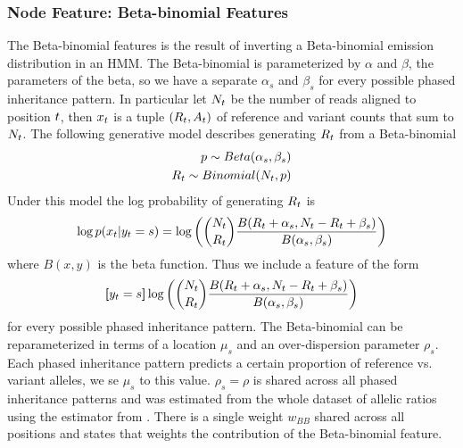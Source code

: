 \subsubsection{Node Feature: Beta-binomial Features}
The Beta-binomial features is the result of inverting a Beta-binomial emission distribution in an HMM. The Beta-binomial is parameterized by $\alpha$ and $\beta$, the parameters of the beta, so we have a separate $\alpha_s$ and $\beta_s$ for every possible phased inheritance pattern. In particular let $N_{t}$ be the number of reads aligned to position $t$, then $x_{t}$ is a tuple $(R_{t}, A_{t})$ of reference and variant counts that sum to $N_{t}$. The following generative model describes generating $R_{t}$ from a Beta-binomial
\begin{align*}
p \sim Beta(\alpha_s, \beta_s)\\
R_{t} \sim Binomial(N_{t}, p)
\end{align*}
Under this model the log probability of generating $R_{t}$ is
\begin{align*}
\log p(x_{t} | y_{t} = s) = \log \left(\binom{N_{t}}{R_{t}} \frac{B(R_{t} + \alpha_s, N_{t} - R_{t} + \beta_s)}{B(\alpha_s, \beta_s)}\right)
\end{align*}
where $B(x,y)$ is the beta function. Thus we include a feature of the form
\begin{align*}
\bm{[}y_{t} = s\bm{]}\log \left(\binom{N_{t}}{R_{t}} \frac{B(R_{t} + \alpha_s, N_{t} - R_{t} + \beta_s)}{B(\alpha_s, \beta_s)}\right) 
\end{align*}
for every possible phased inheritance pattern. The Beta-binomial can be reparameterized in terms of a location $\mu_s$ and an over-dispersion parameter $\rho_s$. Each phased inheritance pattern predicts a certain proportion of reference vs. variant alleles, we se $\mu_s$ to this value. $\rho_s = \rho$ is shared across all phased inheritance patterns and was estimated from the whole dataset of allelic ratios using the estimator from \citet{weirHill2002}. There is a single weight $w_{BB}$ shared across all positions and states that weights the contribution of the Beta-binomial feature.


